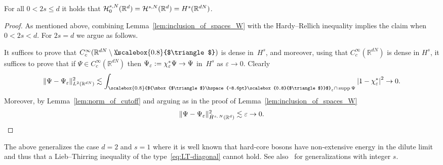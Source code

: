 \documentclass[AHL, Unicode, longabstracts, published]{cedram}
\newcommand*\eps{\varepsilon}
\newcommand*\R {\mathbb{R}}
\newcommand\1{{\ensuremath {\mathds 1} }}
\newcommand{\cH}{\mathcal{H}}
\DeclareMathOperator{\supp}{supp}
\newcommand{\bDelta}{{\mbox{$\triangle$}\hspace{-8.6pt}\scalebox{0.8}{$\triangle$}}}
\newcommand{\scriptbDelta}{\scalebox{0.8}{$\bDelta$}}
\begin{document}
\begin{lemm}\label{lem:inclusion_of_spaces_0}
For all $0 < 2s \le d$ it holds that $\cH^{s,N}_0(\R^d) = \cH^{s,N}(\R^d)\linebreak= H^s(\R^{dN})$.
\end{lemm}
\begin{proof}
As mentioned above, combining Lemma~\ref{lem:inclusion_of_spaces_W} with the Hardy--Rellich inequality implies the claim when $0<2s<d$. For $2s=d$ we argue as follows.

It suffices to prove that $C_c^\infty(\R^{dN} \setminus \bDelta)$ is dense in~$H^s$, and moreover, using that $C_c^\infty(\R^{dN})$ is dense in $H^s$, it suffices to prove that if $\Psi \in C_c^\infty(\R^{dN})$ then $\Psi_\eps := \chi^*_\eps\Psi\linebreak\to \Psi$ in~$H^s$ as $\eps\to 0$. Clearly
\[
\|\Psi-\Psi_\eps\|_{L^2(\R^{dN})}^2
\lesssim \int_{\scriptbDelta_\eps \cap\, \supp \Psi} \left|1-\chi^*_\eps\right|^2 \to 0.
\]
Moreover, by Lemma~\ref{lem:norm_of_cutoff} and arguing as in the proof of Lemma~\ref{lem:inclusion_of_spaces_W}
\begin{equation*}
\|\Psi-\Psi_\eps\|_{\dot{H}^{s,\,N}(\R^{d})}^2
\lesssim \eps \to 0.\qedhere
\end{equation*}
\end{proof}


The above generalizes the case $d=2$ and $s=1$ where it is well known that hard-core bosons have non-extensive energy in the dilute limit~\cite{LieYng-01} and thus that a Lieb--Thirring inequality of the type~\eqref{eq:LT-diagonal} cannot hold. See also~\cite{Svendsen-81} for generalizations with integer $s$.




\end{document}
